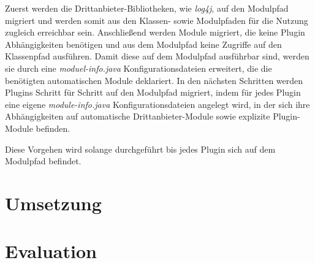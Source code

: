 Zuerst werden die Drittanbieter-Bibliotheken, wie \textit{log4j}, auf den Modulpfad migriert und werden somit aus den Klassen- sowie Modulpfaden für die Nutzung zugleich erreichbar sein. Anschließend werden Module migriert, die keine Plugin Abhängigkeiten benötigen und aus dem Modulpfad keine Zugriffe auf den Klassenpfad ausführen. 
Damit diese auf dem Modulpfad ausführbar sind, werden sie durch eine \textit{moduel-info.java} Konfigurationsdateien erweitert, die die benötigten automatischen Module deklariert. In den nächsten Schritten werden Plugins Schritt für Schritt auf den Modulpfad migriert, indem für jedes Plugin eine eigene \textit{module-info.java} Konfigurationsdateien angelegt wird, in der sich ihre Abhängigkeiten auf automatische Drittanbieter-Module sowie explizite Plugin-Module befinden.


Diese Vorgehen wird solange durchgeführt bis jedes Plugin sich auf dem Modulpfad befindet. 


\section{Umsetzung}

 

\section{Evaluation}




